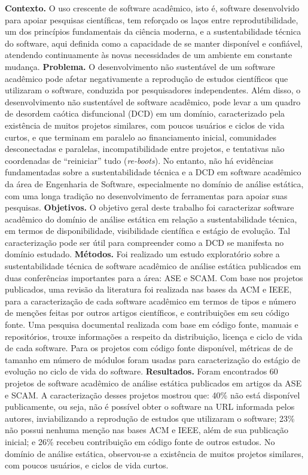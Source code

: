 \textbf{Contexto.}
O uso crescente de software acadêmico, isto é,
software desenvolvido para apoiar pesquisas científicas,
tem reforçado os laços entre
reprodutibilidade, um dos princípios fundamentais da ciência moderna,
e a sustentabilidade técnica do software,
aqui definida como a capacidade de se manter disponível e confiável,
atendendo continuamente às novas necessidades de um ambiente em constante
mudança.
%
\textbf{Problema.}
O desenvolvimento não sustentável de um software acadêmico pode
afetar negativamente a reprodução de estudos científicos que utilizaram o
software,
conduzida por pesquisadores independentes.
Além disso, o desenvolvimento não sustentável de software acadêmico,
pode levar a um quadro de desordem caótica disfuncional (DCD) em um domínio,
caracterizado pela existência de muitos projetos similares, com poucos
usuários e ciclos de vida curtos, e que terminam em paralelo ao
financiamento
inicial, comunidades desconectadas e paralelas, incompatibilidade entre
projetos, e tentativas não coordenadas de ``reiniciar'' tudo
({\it re-boots}).
%
No entanto, não há evidências fundamentadas sobre a sustentabilidade técnica
e a DCD em software acadêmico da área de Engenharia de Software,
especialmente
no domínio de análise estática, com uma longa tradição no
desenvolvimento de ferramentas para apoiar suas pesquisas.
%
\textbf{Objetivos.}
O objetivo geral deste trabalho foi
caracterizar software acadêmico do domínio de análise estática
em relação a sustentabilidade técnica,
em termos de disponibilidade, visibilidade científica e estágio de evolução.
Tal caracterização pode ser útil para compreender como a DCD se manifesta
no domínio estudado.
%
\textbf{Métodos.}
Foi realizado um estudo exploratório sobre a sustentabilidade
técnica de software acadêmico de análise estática
publicados em duas conferências importantes para a área: ASE e SCAM.
%
Com base nos projetos publicados,
uma revisão da literatura foi realizada nas bases da ACM e IEEE,
para a caracterização de cada software acadêmico
em termos de tipos e número de menções feitas por outros artigos
científicos,
e contribuições em seu código fonte.
Uma pesquisa documental realizada com base em
código fonte, manuais e repositórios, trouxe informações a respeito da
distribuição, licença e ciclo de vida de cada software.
Para os projetos com código fonte disponível, métricas de
de tamanho em número de módulos foram usadas para caracterização do
estágio de evolução no ciclo de vida do software.
%
\textbf{Resultados.}
Foram encontrados 60 projetos de software acadêmico de análise estática
publicados em artigos da ASE e SCAM.
%
A caracterização desses projetos mostrou que:
40\% não está disponível publicamente, ou seja,
não é possível obter o software na URL informada pelos autores,
inviabilizando a reprodução de estudos que utilizaram o software;
%
23\% não possui nenhuma menção nas bases ACM e IEEE, além de sua publicação
inicial; e
26\% recebeu contribuição em código fonte de outros estudos.
No domínio de análise estática, observou-se a existência de muitos projetos
similares, com poucos usuários, e ciclos de vida curtos.
